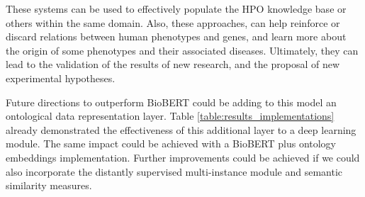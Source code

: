 
These systems can be used to effectively populate the HPO knowledge base or others within the same domain. Also, these approaches, can help reinforce or discard relations between human phenotypes and genes, and learn more about the origin of some phenotypes and their associated diseases. Ultimately, they can lead to the validation of the results of new research, and the proposal of new experimental hypotheses.

Future directions to outperform BioBERT could be adding to this model an ontological data representation layer. Table \ref{table:results_implementations} already demonstrated the effectiveness of this additional layer to a deep learning module. The same impact could be achieved with a BioBERT plus ontology embeddings implementation. Further improvements could be achieved if we could also incorporate the distantly supervised multi-instance module and semantic similarity measures. 








